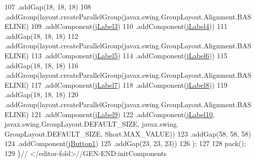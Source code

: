 \begin{DoxyCode}
107                 .addGap(18, 18, 18)
108                 .addGroup(layout.createParallelGroup(javax.swing.GroupLayout.Alignment.BASELINE)
109                     .addComponent(\mbox{\hyperlink{class_interfaz_package_1_1_consulta_lector_a105b198c795b5ad60698132d959db7c1}{jLabel3}})
110                     .addComponent(\mbox{\hyperlink{class_interfaz_package_1_1_consulta_lector_a17804aaae39ab2791472fa0422b576ff}{jLabel4}}))
111                 .addGap(18, 18, 18)
112                 .addGroup(layout.createParallelGroup(javax.swing.GroupLayout.Alignment.BASELINE)
113                     .addComponent(\mbox{\hyperlink{class_interfaz_package_1_1_consulta_lector_aae29076b214d7968c66c12c3cb9dcab2}{jLabel5}})
114                     .addComponent(\mbox{\hyperlink{class_interfaz_package_1_1_consulta_lector_a1ae0bbc522d743dbe6a5df3d341f7b3b}{jLabel6}}))
115                 .addGap(18, 18, 18)
116                 .addGroup(layout.createParallelGroup(javax.swing.GroupLayout.Alignment.BASELINE)
117                     .addComponent(\mbox{\hyperlink{class_interfaz_package_1_1_consulta_lector_a0811e604bafe32c5d692a79c0f604233}{jLabel7}})
118                     .addComponent(\mbox{\hyperlink{class_interfaz_package_1_1_consulta_lector_a588cac9adcc7b646bf632082a010dde4}{jLabel8}}))
119                 .addGap(18, 18, 18)
120                 .addGroup(layout.createParallelGroup(javax.swing.GroupLayout.Alignment.BASELINE)
121                     .addComponent(\mbox{\hyperlink{class_interfaz_package_1_1_consulta_lector_a96866944f1cce16d0348b78422bbb375}{jLabel9}})
122                     .addComponent(\mbox{\hyperlink{class_interfaz_package_1_1_consulta_lector_a4325d1c8a4fb7c899a653eaf0380ccad}{jLabel10}}, javax.swing.GroupLayout.DEFAULT\_SIZE, javax.swing.
      GroupLayout.DEFAULT\_SIZE, Short.MAX\_VALUE))
123                 .addGap(58, 58, 58)
124                 .addComponent(\mbox{\hyperlink{class_interfaz_package_1_1_consulta_lector_a89e1d76ca4c265da8a91df4b4a2a030d}{jButton1}})
125                 .addGap(23, 23, 23))
126         );
127 
128         pack();
129     \}\textcolor{comment}{// </editor-fold>//GEN-END:initComponents}
\end{DoxyCode}
\mbox{\label{class_interfaz_package_1_1_consulta_lector_a61728802e88ad23c202f7ede6783b30c}} 
